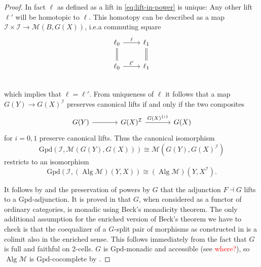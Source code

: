 \documentclass[a4paper]{article}
\newcommand{\todo}[1]{\textcolor{red}{#1}}
\theoremstyle{remark}
\theoremstyle{definition}
\begin{document}
\begin{proof}
  In fact $\ell$ as defined as a lift in \eqref{eq:lift-in-power} is unique:
  Any other lift $\ell'$ will be homotopic to $\ell$.
  This homotopy can be described as a map $\mathcal{I} \times \mathcal{I} \rightarrow \mathcal{M}(B, G(X))$, i.e.\@ a commuting square
  \begin{equation}
    \begin{tikzcd}
      \ell_0 \arrow[r, "\ell"] \arrow[d, equals] & \ell_1 \arrow[d, equals] \\
      \ell_0 \arrow[r, "\ell'"] & \ell_1 \\
    \end{tikzcd}
  \end{equation}
  which implies that $\ell = \ell'$.
  From uniqueness of $\ell$ it follows that a map $G(Y) \rightarrow G(X)^\mathcal{I}$ preserves canonical lifts if and only if the two composites
  \begin{equation}
    \begin{tikzcd}[column sep=large]
      G(Y) \arrow[r] & G(X)^\mathcal{I} \arrow[r, "G(X)^{\{i\}}"] & G(X)
    \end{tikzcd}
  \end{equation}
  for $i = 0, 1$ preserve canonical lifts.
  Thus the canonical isomorphism
  \begin{equation}
    \mathrm{Gpd}(\mathcal{I}, \mathcal{M}(G(Y), G(X))) \cong \mathcal{M}(G(Y), G(X)^\mathcal{I})
  \end{equation}
  restricts to an isomorphism
  \begin{equation}
    \mathrm{Gpd}(\mathcal{I}, (\operatorname{Alg} \mathcal{M})(Y, X)) \cong (\operatorname{Alg} \mathcal{M})(Y, X^\mathcal{I}).
  \end{equation}

  It follows by \cite[theorem 4.85]{basic-concepts-of-enriched-category-theory} and the preservation of powers by $G$ that the adjunction $F \dashv G$ lifts to a $\mathrm{Gpd}$-adjunction.
  It is proved in \cite{algebraic-models} that $G$, when considered as a functor of ordinary categories, is monadic using Beck's monadicity theorem.
  The only additional assumption for the enriched version of Beck's theorem \cite[theorem II.2.1]{enriched-kan-extensions} we have to check is that the coequalizer of a $G$-split pair of morphisms as constructed in \cite{algebraic-models} is a colimit also in the enriched sense.
  This follows immediately from the fact that $G$ is full and faithful on 2-cells.
  $G$ is $\mathrm{Gpd}$-monadic and accessible (see \todo{where?}), so $\operatorname{Alg} \mathcal{M}$ is $\mathrm{Gpd}$-cocomplete by \cite[theorem 3.8]{two-dimensional-monad-theory}.


\end{proof}
\end{document}
